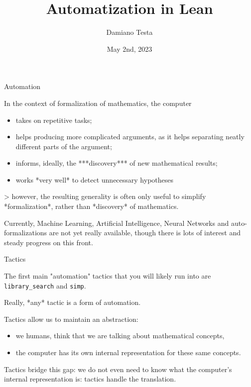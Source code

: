 \documentclass{beamer}
\title{Automatization in Lean}
\author{Damiano Testa}
\institute{University of Warwick}
\date{May 2nd, 2023}
\begin{document}
\frame{\titlepage}

\begin{frame}[fragile]
{Automation}

In the context of formalization of mathematics, the computer

\begin{itemize}
\item
  takes on repetitive tasks;
\item
  helps producing more complicated arguments, as it helps separating neatly different parts of the argument;
\item
  informs, ideally, the ***discovery*** of new mathematical results;
\item
  works *very well* to detect unnecessary hypotheses
\end{itemize}

  > however, the resulting generality is often only useful to simplify *formalization*, rather than *discovery* of mathematics.


Currently, Machine Learning, Artificial Intelligence, Neural Networks and auto-formalizations are not yet really available, though there is lots of interest and steady progress on this front.
\end{frame}

\begin{frame}[fragile]{Tactics}

The first main "automation" tactics that you will likely run into are {\verb`library_search`} and {\verb`simp`}.

Really, *any* tactic is a form of automation.

Tactics allow us to maintain an abstraction:

\begin{itemize}
\item
  we humans, think that we are talking about mathematical concepts,
\item
  the computer has its own internal representation for these same concepts.
\end{itemize}

Tactics bridge this gap: we do not even need to know what the computer's internal representation is: tactics handle the translation.
\end{frame}
\end{document}

